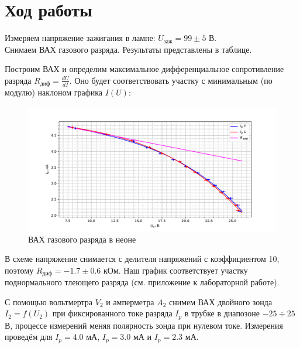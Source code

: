 \documentclass[a4paper, 10pt]{article}
\begin{document}
        \section*{Ход работы}
        Измеряем напряжение зажигания в лампе: $U_{\text{заж}} = 99\pm5 $ В.\\
        Снимаем ВАХ газового разряда. Результаты представлены в таблице.

        Построим ВАХ и определим максимальное дифференциальное сопротивление разряда $R_{\text{диф}} = \frac{dU}{dI}$. Оно будет соответствовать участку с минимальным (по модулю) наклоном графика $I(U)$:

        \begin{figure}[h!]
        	\centering
        	\includegraphics[width = \textwidth]{vah.pdf}
        	\caption{ВАХ газового разряда в неоне}
        \end{figure}
        В схеме напряжение снимается с делителя напряжений с коэффициентом 10, поэтому $R_{\text{диф}} = -1.7 \pm 0.6$ кОм. Наш график соответствует участку поднормального тлеющего разряда (см. приложение к лабораторной работе).

        С помощью вольтмертра $V_2$ и амперметра $A_2$ снимем ВАХ двойного зонда $I_2 = f(U_2)$ при фиксированного токе разряда $I_p$ в трубке в диапозоне $-25 \div 25$ В, процессе измерений меняя полярность зонда при нулевом токе. Измерения проведём для $I_p = 4.0$ мА, $I_p = 3.0$ мА  и $I_p = 2.3$ мА.
\end{document}
